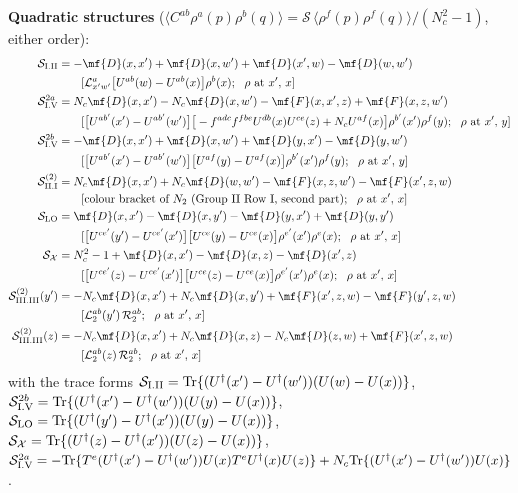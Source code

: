 \noindent\textbf{Quadratic structures} ($\langle C^{ab}\rho^{a}(p)\rho^{b}(q)\rangle=\mathcal{S}\,\langle\rho^{f}(p)\rho^{f}(q)\rangle/(N_{c}^{2}-1)$, either order):
\begin{align}
\mathcal{S}_{\rm I.II}&=-\mf{D}(x,x')+\mf{D}(x,w')+\mf{D}(x',w)-\mf{D}(w,w')\notag\\&\qquad[\mathcal{L}^{a}_{x'w'}\big[U^{ab}(w)-U^{ab}(x)\big]\rho^{b}(x);\ \ \rho\text{ at }x',\,x]\notag\\
\mathcal{S}_{\rm I.V}^{2a}&=N_{c}\mf{D}(x,x')-N_{c}\mf{D}(x,w')-\mf{F}(x,x',z)+\mf{F}(x,z,w')\notag\\&\qquad[\big[U^{ab'}(x')-U^{ab'}(w')\big]\big[-f^{adc}f^{fbe}U^{db}(x)U^{ce}(z)+N_{c}U^{af}(x)\big]\rho^{b'}(x')\rho^{f}(y);\ \ \rho\text{ at }x',\,y]\notag\\
\mathcal{S}_{\rm I.V}^{2b}&=-\mf{D}(x,x')+\mf{D}(x,w')+\mf{D}(y,x')-\mf{D}(y,w')\notag\\&\qquad[\big[U^{ab'}(x')-U^{ab'}(w')\big]\big[U^{af}(y)-U^{af}(x)\big]\rho^{b'}(x')\rho^{f}(y);\ \ \rho\text{ at }x',\,y]\notag\\
\mathcal{S}_{\rm II.I}^{(2)}&=N_{c}\mf{D}(x,x')+N_{c}\mf{D}(w,w')-\mf{F}(x,z,w')-\mf{F}(x',z,w)\notag\\&\qquad[\text{colour bracket of } N_{2}\text{ (Group II Row I, second part)};\ \ \rho\text{ at }x',\,x]\notag\\
\mathcal{S}_{\rm LO}&=\mf{D}(x,x')-\mf{D}(x,y')-\mf{D}(y,x')+\mf{D}(y,y')\notag\\&\qquad[\big[U^{ce'}(y')-U^{ce'}(x')\big]\big[U^{ce}(y)-U^{ce}(x)\big]\rho^{e'}(x')\rho^{e}(x);\ \ \rho\text{ at }x',\,x]\notag\\
\mathcal{S}_{\mathcal{X}}&=N_{c}^{2}-1+\mf{D}(x,x')-\mf{D}(x,z)-\mf{D}(x',z)\notag\\&\qquad[\big[U^{ce'}(z)-U^{ce'}(x')\big]\big[U^{ce}(z)-U^{ce}(x)\big]\rho^{e'}(x')\rho^{e}(x);\ \ \rho\text{ at }x',\,x]\notag\\
\mathcal{S}_{\rm III.III}^{(2)}(y')&=-N_{c}\mf{D}(x,x')+N_{c}\mf{D}(x,y')+\mf{F}(x',z,w)-\mf{F}(y',z,w)\notag\\&\qquad[\mathcal{L}_{2}^{ab}(y')\,\mathcal{R}_{2}^{ab};\ \ \rho\text{ at }x',\,x]\notag\\
\mathcal{S}_{\rm III.III}^{(2)}(z)&=-N_{c}\mf{D}(x,x')+N_{c}\mf{D}(x,z)-N_{c}\mf{D}(z,w)+\mf{F}(x',z,w)\notag\\&\qquad[\mathcal{L}_{2}^{ab}(z)\,\mathcal{R}_{2}^{ab};\ \ \rho\text{ at }x',\,x]\notag
\end{align}
with the trace forms $\mathcal{S}_{\rm I.II}={\rm Tr}\{(U^{\dagger}(x')-U^{\dagger}(w'))(U(w)-U(x))\}$, $\mathcal{S}_{\rm I.V}^{2b}={\rm Tr}\{(U^{\dagger}(x')-U^{\dagger}(w'))(U(y)-U(x))\}$, $\mathcal{S}_{\rm LO}={\rm Tr}\{(U^{\dagger}(y')-U^{\dagger}(x'))(U(y)-U(x))\}$, $\mathcal{S}_{\mathcal{X}}={\rm Tr}\{(U^{\dagger}(z)-U^{\dagger}(x'))(U(z)-U(x))\}$, $\mathcal{S}^{2a}_{\rm I.V}=-{\rm Tr}\{T^{e}(U^{\dagger}(x')-U^{\dagger}(w'))U(x)T^{e}U^{\dagger}(x)U(z)\}+N_{c}{\rm Tr}\{(U^{\dagger}(x')-U^{\dagger}(w'))U(x)\}$.\par

